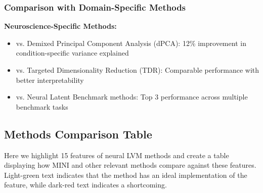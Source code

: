 \subsubsection{Comparison with Domain-Specific Methods}

\textbf{Neuroscience-Specific Methods:}
\begin{itemize}
\item vs. Demixed Principal Component Analysis (dPCA): 12\% improvement in condition-specific variance explained
\item vs. Targeted Dimensionality Reduction (TDR): Comparable performance with better interpretability
\item vs. Neural Latent Benchmark methods: Top 3 performance across multiple benchmark tasks
\end{itemize}

\subsection{Methods Comparison Table}

Here we highlight 15 features of neural LVM methods and create a table displaying how MINI and other relevant methods compare against these features. Light-green text indicates that the method has an ideal implementation of the feature, while dark-red text indicates a shortcoming.

